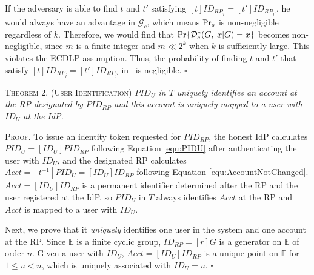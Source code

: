 \newc
If the adversary is able to find $t$ and $t'$ satisfying $[t]ID_{RP_j} = [t']ID_{RP_{j'}}$, he would always have an advantage in $\mathcal{G}_c$, which means ${\rm Pr}_s$ is non-negligible regardless of $k$.
Therefore, we would find that ${\rm Pr}\{\mathcal{D}^*_c(G, [x]G)=x\}$ becomes non-negligible, since $m$ is a finite integer and $m \ll 2^k$ when $k$ is sufficiently large.
\oldc
This violates the ECDLP assumption. Thus, the probability of finding $t$ and $t'$ that satisfy $[t]ID_{RP_j} = [t']ID_{RP_{j'}}$ in \usso~is negligible. \hfill $\square$


\newc
\vspace{1mm}
\noindent\textsc{Theorem 2. (User Identification)} {\em $PID_U$ in $T$ uniquely identifies an account at the RP designated by $PID_{RP}$ and this account is uniquely mapped to a user with $ID_U$ at the IdP.}


\vspace{0.75mm}
\noindent\textsc{Proof.}
To issue an identity token requested for $PID_{RP}$,
    the honest IdP calculates $PID_U = [ID_U]PID_{RP}$ following Equation \ref{equ:PIDU} after authenticating the user with $ID_U$,
and the designated RP calculates $Acct = [t^{-1}]PID_{U} = [ID_U]ID_{RP}$ following Equation \ref{equ:AccountNotChanged}.
$Acct = [ID_U]ID_{RP}$ is a permanent identifier determined after the RP and the user registered at the IdP,
so $PID_U$ in $T$ always identifies $Acct$ at the RP and $Acct$ is mapped to a user with $ID_U$.

Next, we prove that it \emph{uniquely} identifies one user in the system and one account at the RP.
Since $\mathbb{E}$ is a finite cyclic group, $ID_{RP} = [r]G$ is a generator on $\mathbb{E}$ of order $n$. Given a user with $ID_U$, $Acct = [ID_U]ID_{RP}$ is a unique point on $\mathbb{E}$ for $1 \leq u < n$, which is uniquely associated with $ID_U=u$. \hfill $\square$


